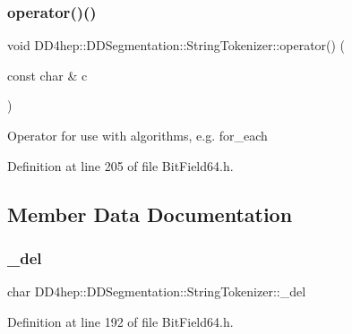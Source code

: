 \subsubsection{\texorpdfstring{operator()()}{operator()()}}
{\footnotesize\ttfamily void D\+D4hep\+::\+D\+D\+Segmentation\+::\+String\+Tokenizer\+::operator() (\begin{DoxyParamCaption}\item[{const char \&}]{c }\end{DoxyParamCaption})\hspace{0.3cm}{\ttfamily [inline]}}

Operator for use with algorithms, e.\+g. for\+\_\+each 

Definition at line 205 of file Bit\+Field64.\+h.



\subsection{Member Data Documentation}
\hypertarget{class_d_d4hep_1_1_d_d_segmentation_1_1_string_tokenizer_a0d18dc607eefcdae2de3f5b01d8294f5}{}\label{class_d_d4hep_1_1_d_d_segmentation_1_1_string_tokenizer_a0d18dc607eefcdae2de3f5b01d8294f5} 
\subsubsection{\texorpdfstring{\+\_\+del}{\_del}}
{\footnotesize\ttfamily char D\+D4hep\+::\+D\+D\+Segmentation\+::\+String\+Tokenizer\+::\+\_\+del\hspace{0.3cm}{\ttfamily [private]}}



Definition at line 192 of file Bit\+Field64.\+h.

\hypertarget{class_d_d4hep_1_1_d_d_segmentation_1_1_string_tokenizer_a3865b5d3ed0d300132963b9f214028e0}{}\label{class_d_d4hep_1_1_d_d_segmentation_1_1_string_tokenizer_a3865b5d3ed0d300132963b9f214028e0} 
